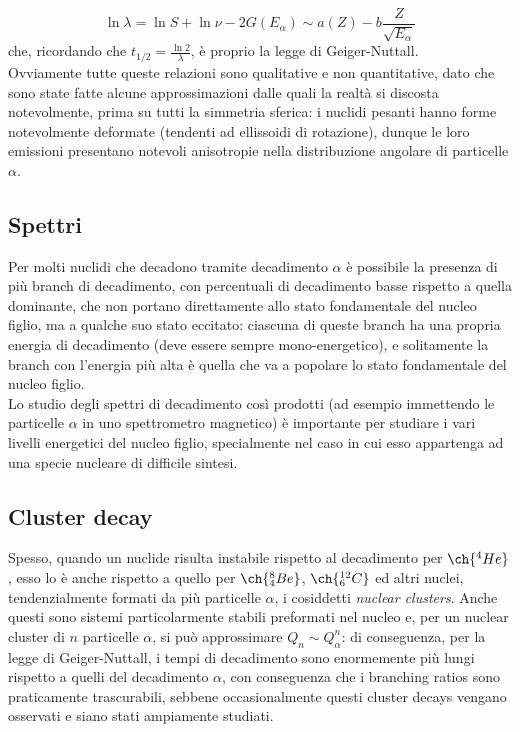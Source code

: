 \begin{equation}
	\ln \lambda = \ln S + \ln \nu - 2 G(E_{\alpha}) \sim a(Z) - b \frac{Z}{\sqrt{E_{\alpha}}}
	\label{eq:2.17}
\end{equation}
che, ricordando che $ t_{1/2} = \frac{\ln 2}{\lambda} $, è proprio la legge di Geiger-Nuttall.\\
Ovviamente tutte queste relazioni sono qualitative e non quantitative, dato che sono state fatte alcune approssimazioni dalle quali la realtà si discosta notevolmente, prima su tutti la simmetria sferica: i nuclidi pesanti hanno forme notevolmente deformate (tendenti ad ellissoidi di rotazione), dunque le loro emissioni presentano notevoli anisotropie nella distribuzione angolare di particelle $ \alpha $.

\subsection{Spettri}

Per molti nuclidi che decadono tramite decadimento $ \alpha $ è possibile la presenza di più branch di decadimento, con percentuali di decadimento basse rispetto a quella dominante, che non portano direttamente allo stato fondamentale del nucleo figlio, ma a qualche suo stato eccitato: ciascuna di queste branch ha una propria energia di decadimento (deve essere sempre mono-energetico), e solitamente la branch con l'energia più alta è quella che va a popolare lo stato fondamentale del nucleo figlio.\\
Lo studio degli spettri di decadimento così prodotti (ad esempio immettendo le particelle $ \alpha $ in uno spettrometro magnetico) è importante per studiare i vari livelli energetici del nucleo figlio, specialmente nel caso in cui esso appartenga ad una specie nucleare di difficile sintesi.

\subsection{Cluster decay}

Spesso, quando un nuclide risulta instabile rispetto al decadimento per $ \ch{^4 He} $, esso lo è anche rispetto a quello per $ \ch{^8_4 Be} $, $ \ch{^{12}_6 C} $ ed altri nuclei, tendenzialmente formati da più particelle $ \alpha $, i cosiddetti \textit{nuclear clusters}. Anche questi sono sistemi particolarmente stabili preformati nel nucleo e, per un nuclear cluster di $ n $ particelle $ \alpha $, si può approssimare $ Q_n \sim Q_{\alpha}^n $: di conseguenza, per la legge di Geiger-Nuttall, i tempi di decadimento sono enormemente più lungi rispetto a quelli del decadimento $ \alpha $, con conseguenza che i branching ratios sono praticamente trascurabili, sebbene occasionalmente questi cluster decays vengano osservati e siano stati ampiamente studiati.










